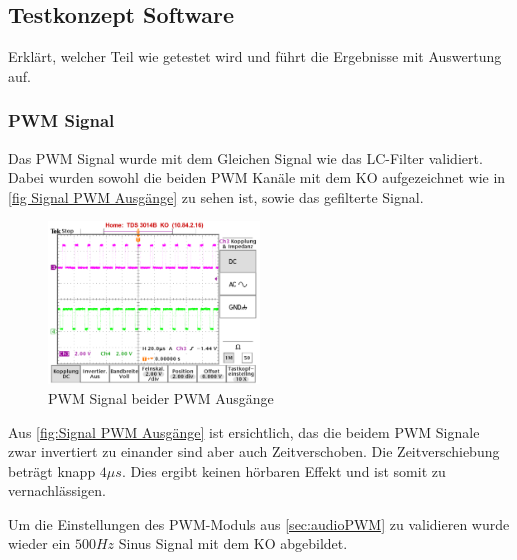 \subsection{Testkonzept Software}\label{sec:testkonzeptSoftware}

Erklärt, welcher Teil wie getestet wird und führt die Ergebnisse mit Auswertung auf.

\subsubsection{PWM Signal}\label{sec: Validierung PWM Signal}
Das PWM Signal wurde mit dem Gleichen Signal wie das LC-Filter validiert. Dabei wurden sowohl die beiden PWM Kanäle mit dem KO aufgezeichnet wie in \autoref{fig Signal PWM Ausgänge} zu sehen ist, sowie das gefilterte Signal. 

\begin{figure}[htbp]
	\centering
	\includegraphics[width=0.5\textwidth]{Data/PWM_Signal_500Hz_Mono_mit_Infos.png}
	\caption[PWM Signal beider PWM Ausgänge]{PWM Signal beider PWM Ausgänge}
	\label{fig:Signal PWM Ausgänge}
\end{figure} 


Aus \autoref{fig:Signal PWM Ausgänge} ist ersichtlich, das die beidem PWM Signale zwar invertiert zu einander sind aber auch Zeitverschoben. Die Zeitverschiebung beträgt knapp $4\mu s$. Dies ergibt keinen hörbaren Effekt und ist somit zu vernachlässigen.

Um die Einstellungen des PWM-Moduls aus \ref{sec:audioPWM} zu validieren wurde wieder ein $500Hz$ Sinus Signal mit dem KO abgebildet.



